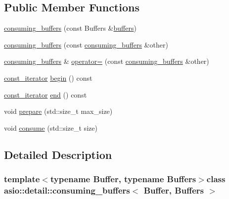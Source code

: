 \subsection*{Public Member Functions}
\begin{DoxyCompactItemize}
\item 
\hyperlink{classasio_1_1detail_1_1consuming__buffers_a341db3b10600a97331d79989a0fce056}{consuming\+\_\+buffers} (const Buffers \&\hyperlink{group__async__read_ga54dede45c3175148a77fe6635222c47d}{buffers})
\item 
\hyperlink{classasio_1_1detail_1_1consuming__buffers_ad69056f3f2a85dbe502043701bb50b50}{consuming\+\_\+buffers} (const \hyperlink{classasio_1_1detail_1_1consuming__buffers}{consuming\+\_\+buffers} \&other)
\item 
\hyperlink{classasio_1_1detail_1_1consuming__buffers}{consuming\+\_\+buffers} \& \hyperlink{classasio_1_1detail_1_1consuming__buffers_aabd80b6bd5ea9ca825104c39c434512b}{operator=} (const \hyperlink{classasio_1_1detail_1_1consuming__buffers}{consuming\+\_\+buffers} \&other)
\item 
\hyperlink{classasio_1_1detail_1_1consuming__buffers_a0abc4cc4aed2717a1de4b38d78f3d525}{const\+\_\+iterator} \hyperlink{classasio_1_1detail_1_1consuming__buffers_a27a3ebd615b5c09d031a9dfd903c4d38}{begin} () const 
\item 
\hyperlink{classasio_1_1detail_1_1consuming__buffers_a0abc4cc4aed2717a1de4b38d78f3d525}{const\+\_\+iterator} \hyperlink{classasio_1_1detail_1_1consuming__buffers_af0b2734ba892215a6d6a69e973bc06d4}{end} () const 
\item 
void \hyperlink{classasio_1_1detail_1_1consuming__buffers_a5df95ce56da8fad7e548f51efdf0d976}{prepare} (std\+::size\+\_\+t max\+\_\+size)
\item 
void \hyperlink{classasio_1_1detail_1_1consuming__buffers_a0cbeff9a36e57806ae9ab88778d4d99e}{consume} (std\+::size\+\_\+t size)
\end{DoxyCompactItemize}


\subsection{Detailed Description}
\subsubsection*{template$<$typename Buffer, typename Buffers$>$class asio\+::detail\+::consuming\+\_\+buffers$<$ Buffer, Buffers $>$}



